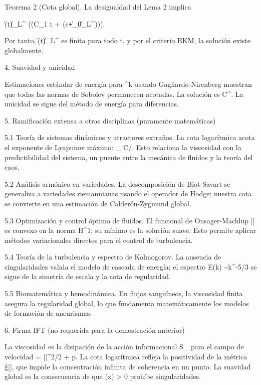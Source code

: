 \documentclass[12pt,a4paper]{book}
\begin{document}
Teorema 2 (Cota global). La desigualdad del Lema 2 implica

\|\boldsymbol{\omega}(t)\|_{L^\infty} \le \exp(\exp(C_1 t + \ln\ln(e+\|\boldsymbol{\omega}_0\|_{L^\infty}))).

Por tanto, \|\boldsymbol{\omega}(t)\|_{L^\infty} es finita para todo t, y por el criterio BKM, la solución existe globalmente.

4. Suavidad y unicidad

Estimaciones estándar de energía para \nabla^k \boldsymbol{\omega} usando Gagliardo-Nirenberg muestran que todas las normas de Sobolev permanecen acotadas. La solución es C^\infty. La unicidad se sigue del método de energía para diferencias.

5. Ramificación extensa a otras disciplinas (puramente matemáticas)

5.1 Teoría de sistemas dinámicos y atractores extraños.
La cota logarítmica acota el exponente de Lyapunov máximo: \lambda_{\max} \le C/\nu. Esto relaciona la viscosidad con la predictibilidad del sistema, un puente entre la mecánica de fluidos y la teoría del caos.

5.2 Análisis armónico en variedades.
La descomposición de Biot-Savart se generaliza a variedades riemannianas usando el operador de Hodge; nuestra cota se convierte en una estimación de Calderón-Zygmund global.

5.3 Optimización y control óptimo de fluidos.
El funcional de Onsager-Machlup [] es convexo en la norma H^1; su mínimo es la solución suave. Esto permite aplicar métodos variacionales directos para el control de turbulencia.

5.4 Teoría de la turbulencia y espectro de Kolmogorov.
La ausencia de singularidades valida el modelo de cascada de energía; el espectro E(k) \sim k^{-5/3} se sigue de la simetría de escala y la cota de regularidad.

5.5 Biomatemática y hemodinámica.
En flujos sanguíneos, la viscosidad finita asegura la regularidad global, lo que fundamenta matemáticamente los modelos de formación de aneurismas.

6. Firma IFT (no requerida para la demostración anterior)

La viscosidad \nu es la disipación de la acción informacional S_{} para el campo de velocidad \rho = ||^2/2 + p. La cota logarítmica refleja la positividad de la métrica g̃[\rho], que impide la concentración infinita de coherencia en un punto. La suavidad global es la consecuencia de que \rho(x) > 0 prohíbe singularidades.
\end{document}
